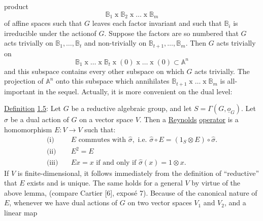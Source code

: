 

product
\[
\mathbb B_1\mathbin{x}\mathbb B_2\mathbin{x}\ldots\mathbin{x}\mathbb B_m
\]
of affine spaces such that $G$ leaves each factor invariant and such that $\mathbb B_i$ is irreducible under the actionof $G$. Suppose the factors are so numbered that $G$ acts trivially on $\mathbb B_1,\ldots,\mathbb B_t$ and non-trivially on $\mathbb B_{t+1},\ldots,\mathbb B_m$. Then $G$ acts trivially on
\[
\mathbb B_1\mathbin{x}\ldots\mathbin{x}\mathbb B_t\mathbin{x}(0)\mathbin{x}\ldots\mathbin{x}(0)\subset\mathbb A^n
\]
and this subspace contains every other subspace on which $G$ acts trivially. The projection of \(\mathbb{A}^{n}\) onto this subspace which annihilates $\mathbb B_{t+1}\mathbin{x}\ldots\mathbin{x}\mathbb B_m$ is all-important in the sequel. Actually, it is more convenient on the dual level:

\uline{Definition} \uline{1.5}: Let $G$ be a reductive algebraic group, and let $S=\Gamma(G,\underline{o}_G)$. Let $\hat\sigma$ be a dual action of $G$ on a vector space $V$. Then a \uline{Reynolds} \uline{operator} is a homomorphism $E:V\longrightarrow V$ such that:
\[
\begin{aligned}
\text{(i)}\quad &E\text{ commutes with }\hat\sigma,\text{ i.e. }\hat\sigma\circ E=(1_S\otimes E)\circ\hat\sigma.\\
\text{(ii)}\quad &E^2=E\\
\text{(iii)}\quad &Ex=x\text{ if and only if }\hat\sigma(x)=1\otimes x.
\end{aligned}
\]
If $V$ is finite-dimensional, it follows immediately from the definition of ``reductive'' that $E$ exists and is unique. The same holds for a general $V$ by virtue of the above lemma, (compare Cartier [6], exposé 7). Because of the canonical nature of $E$, whenever we have dual actions of $G$ on two vector spaces $V_1$ and $V_2$, and a linear map



